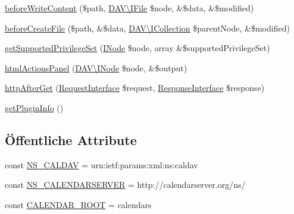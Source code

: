 \begin{DoxyCompactItemize}
\item 
\mbox{\hyperlink{class_sabre_1_1_cal_d_a_v_1_1_plugin_a5ab76aefb7522df40f52adf5792397d2}{before\+Write\+Content}} (\$path, \mbox{\hyperlink{interface_sabre_1_1_d_a_v_1_1_i_file}{D\+A\+V\textbackslash{}\+I\+File}} \$node, \&\$data, \&\$modified)
\item 
\mbox{\hyperlink{class_sabre_1_1_cal_d_a_v_1_1_plugin_acb02561ce127ba8a6b53410e97d23cfb}{before\+Create\+File}} (\$path, \&\$data, \mbox{\hyperlink{interface_sabre_1_1_d_a_v_1_1_i_collection}{D\+A\+V\textbackslash{}\+I\+Collection}} \$parent\+Node, \&\$modified)
\item 
\mbox{\hyperlink{class_sabre_1_1_cal_d_a_v_1_1_plugin_a93ea8b02ec3b301c85ec27242edf0b3d}{get\+Supported\+Privilege\+Set}} (\mbox{\hyperlink{interface_sabre_1_1_d_a_v_1_1_i_node}{I\+Node}} \$node, array \&\$supported\+Privilege\+Set)
\item 
\mbox{\hyperlink{class_sabre_1_1_cal_d_a_v_1_1_plugin_a38c0c46730134305e81ced411f928768}{html\+Actions\+Panel}} (\mbox{\hyperlink{interface_sabre_1_1_d_a_v_1_1_i_node}{D\+A\+V\textbackslash{}\+I\+Node}} \$node, \&\$output)
\item 
\mbox{\hyperlink{class_sabre_1_1_cal_d_a_v_1_1_plugin_a8acb5e85c7c64515028f43fefd75b68d}{http\+After\+Get}} (\mbox{\hyperlink{interface_sabre_1_1_h_t_t_p_1_1_request_interface}{Request\+Interface}} \$request, \mbox{\hyperlink{interface_sabre_1_1_h_t_t_p_1_1_response_interface}{Response\+Interface}} \$response)
\item 
\mbox{\hyperlink{class_sabre_1_1_cal_d_a_v_1_1_plugin_a846412fa6fff563d2a964d881b82d250}{get\+Plugin\+Info}} ()
\end{DoxyCompactItemize}
\subsection*{Öffentliche Attribute}
\begin{DoxyCompactItemize}
\item 
const \mbox{\hyperlink{class_sabre_1_1_cal_d_a_v_1_1_plugin_a67ed1e766e3346b20c1cb9b576e5a5ad}{N\+S\+\_\+\+C\+A\+L\+D\+AV}} = \textquotesingle{}urn\+:ietf\+:params\+:xml\+:ns\+:caldav\textquotesingle{}
\item 
const \mbox{\hyperlink{class_sabre_1_1_cal_d_a_v_1_1_plugin_ab9416b2050283d54cdacfecc7653f907}{N\+S\+\_\+\+C\+A\+L\+E\+N\+D\+A\+R\+S\+E\+R\+V\+ER}} = \textquotesingle{}http\+://calendarserver.\+org/ns/\textquotesingle{}
\item 
const \mbox{\hyperlink{class_sabre_1_1_cal_d_a_v_1_1_plugin_af6f250f8b35c8f0bf70e95fdf6f7fbe0}{C\+A\+L\+E\+N\+D\+A\+R\+\_\+\+R\+O\+OT}} = \textquotesingle{}calendars\textquotesingle{}
\end{DoxyCompactItemize}
